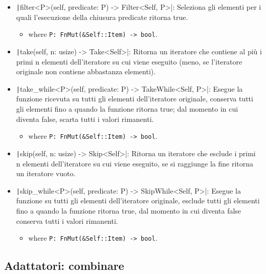 \begin{itemize}
  \item \texttt|filter<P>(self, predicate: P) -> Filter<Self, P>|: Seleziona gli elementi per i quali l'esecuzione della chiusura predicate ritorna true.
        \begin{itemize}
          \item[] where \verb|P: FnMut(&Self::Item) -> bool|.
        \end{itemize}
  \item \texttt|take(self, n: usize) -> Take<Self>|: Ritorna un iteratore che contiene al più i primi n elementi dell'iteratore su cui viene eseguito (meno, se l'iteratore originale non contiene abbastanza elementi).
  \item \texttt|take_while<P>(self, predicate: P) -> TakeWhile<Self, P>|: Esegue la funzione ricevuta su tutti gli elementi dell'iteratore originale, conserva tutti gli elementi fino a quando la funzione ritorna true; dal momento in cui diventa false, scarta tutti i valori rimanenti.
        \begin{itemize}
          \item[] where \verb|P: FnMut(&Self::Item) -> bool|.
        \end{itemize}
  \item \texttt|skip(self, n: usize) -> Skip<Self>|: Ritorna un iteratore che esclude i primi n elementi dell'iteratore su cui viene eseguito, se si raggiunge la fine ritorna un iteratore vuoto.
  \item \texttt|skip_while<P>(self, predicate: P) -> SkipWhile<Self, P>|: Esegue la funzione su tutti gli elementi dell'iteratore originale, esclude tutti gli elementi fino a quando la funzione ritorna true, dal momento in cui diventa false conserva tutti i valori rimanenti.
        \begin{itemize}
          \item[] where \verb|P: FnMut(&Self::Item) -> bool|.
        \end{itemize}
\end{itemize}


\subsection{Adattatori: combinare}

